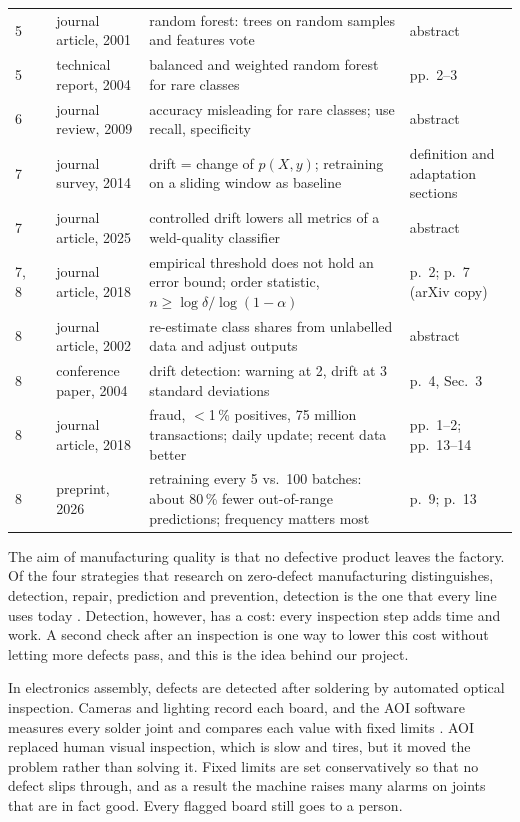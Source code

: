 \documentclass[11pt,a4paper]{article}
\begin{document}
\begin{table}[H]
\begin{tabularx}{\textwidth}{@{}p{0.7cm}p{0.7cm}p{2.6cm}Lp{2.6cm}@{}}
5 & \cite{breiman2001} & journal article, 2001 & random forest: trees on random samples and features vote & abstract \\
5 & \cite{chen2004} & technical report, 2004 & balanced and weighted random forest for rare classes & pp.~2--3 \\
6 & \cite{he2009} & journal review, 2009 & accuracy misleading for rare classes; use recall, specificity & abstract \\
7 & \cite{gama2014} & journal survey, 2014 & drift = change of $p(X,y)$; retraining on a sliding window as baseline & definition and adaptation sections \\
7 & \cite{bauer2025} & journal article, 2025 & controlled drift lowers all metrics of a weld-quality classifier & abstract \\
7, 8 & \cite{tong2018} & journal article, 2018 & empirical threshold does not hold an error bound; order statistic, $n \geq \log\delta/\log(1-\alpha)$ & p.~2; p.~7 (arXiv copy) \\
8 & \cite{saerens2002} & journal article, 2002 & re-estimate class shares from unlabelled data and adjust outputs & abstract \\
8 & \cite{gama2004} & conference paper, 2004 & drift detection: warning at 2, drift at 3 standard deviations & p.~4, Sec.~3 \\
8 & \cite{dalpozzolo2018} & journal article, 2018 & fraud, $<$1\,\% positives, 75 million transactions; daily update; recent data better & pp.~1--2; pp.~13--14 \\
8 & \cite{gao2026} & preprint, 2026 & retraining every 5 vs.\ 100 batches: about 80\,\% fewer out-of-range predictions; frequency matters most & p.~9; p.~13 \\
\bottomrule
\end{tabularx}
\end{table}

The aim of manufacturing quality is that no defective product leaves the factory. Of the four strategies that research on zero-defect manufacturing distinguishes, detection, repair, prediction and prevention, detection is the one that every line uses today \cite{psarommatis2020}. Detection, however, has a cost: every inspection step adds time and work. A second check after an inspection is one way to lower this cost without letting more defects pass, and this is the idea behind our project.

In electronics assembly, defects are detected after soldering by automated optical inspection. Cameras and lighting record each board, and the AOI software measures every solder joint and compares each value with fixed limits \cite{ebayyeh2020}. AOI replaced human visual inspection, which is slow and tires, but it moved the problem rather than solving it. Fixed limits are set conservatively so that no defect slips through, and as a result the machine raises many alarms on joints that are in fact good. Every flagged board still goes to a person.
\end{document}
